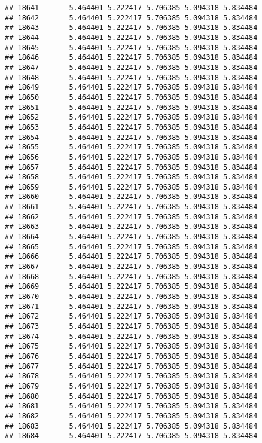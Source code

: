 \documentclass[
]{article}
\begin{document}
\begin{verbatim}
## 18641       5.464401 5.222417 5.706385 5.094318 5.834484
## 18642       5.464401 5.222417 5.706385 5.094318 5.834484
## 18643       5.464401 5.222417 5.706385 5.094318 5.834484
## 18644       5.464401 5.222417 5.706385 5.094318 5.834484
## 18645       5.464401 5.222417 5.706385 5.094318 5.834484
## 18646       5.464401 5.222417 5.706385 5.094318 5.834484
## 18647       5.464401 5.222417 5.706385 5.094318 5.834484
## 18648       5.464401 5.222417 5.706385 5.094318 5.834484
## 18649       5.464401 5.222417 5.706385 5.094318 5.834484
## 18650       5.464401 5.222417 5.706385 5.094318 5.834484
## 18651       5.464401 5.222417 5.706385 5.094318 5.834484
## 18652       5.464401 5.222417 5.706385 5.094318 5.834484
## 18653       5.464401 5.222417 5.706385 5.094318 5.834484
## 18654       5.464401 5.222417 5.706385 5.094318 5.834484
## 18655       5.464401 5.222417 5.706385 5.094318 5.834484
## 18656       5.464401 5.222417 5.706385 5.094318 5.834484
## 18657       5.464401 5.222417 5.706385 5.094318 5.834484
## 18658       5.464401 5.222417 5.706385 5.094318 5.834484
## 18659       5.464401 5.222417 5.706385 5.094318 5.834484
## 18660       5.464401 5.222417 5.706385 5.094318 5.834484
## 18661       5.464401 5.222417 5.706385 5.094318 5.834484
## 18662       5.464401 5.222417 5.706385 5.094318 5.834484
## 18663       5.464401 5.222417 5.706385 5.094318 5.834484
## 18664       5.464401 5.222417 5.706385 5.094318 5.834484
## 18665       5.464401 5.222417 5.706385 5.094318 5.834484
## 18666       5.464401 5.222417 5.706385 5.094318 5.834484
## 18667       5.464401 5.222417 5.706385 5.094318 5.834484
## 18668       5.464401 5.222417 5.706385 5.094318 5.834484
## 18669       5.464401 5.222417 5.706385 5.094318 5.834484
## 18670       5.464401 5.222417 5.706385 5.094318 5.834484
## 18671       5.464401 5.222417 5.706385 5.094318 5.834484
## 18672       5.464401 5.222417 5.706385 5.094318 5.834484
## 18673       5.464401 5.222417 5.706385 5.094318 5.834484
## 18674       5.464401 5.222417 5.706385 5.094318 5.834484
## 18675       5.464401 5.222417 5.706385 5.094318 5.834484
## 18676       5.464401 5.222417 5.706385 5.094318 5.834484
## 18677       5.464401 5.222417 5.706385 5.094318 5.834484
## 18678       5.464401 5.222417 5.706385 5.094318 5.834484
## 18679       5.464401 5.222417 5.706385 5.094318 5.834484
## 18680       5.464401 5.222417 5.706385 5.094318 5.834484
## 18681       5.464401 5.222417 5.706385 5.094318 5.834484
## 18682       5.464401 5.222417 5.706385 5.094318 5.834484
## 18683       5.464401 5.222417 5.706385 5.094318 5.834484
## 18684       5.464401 5.222417 5.706385 5.094318 5.834484

\end{verbatim}
\end{document}
